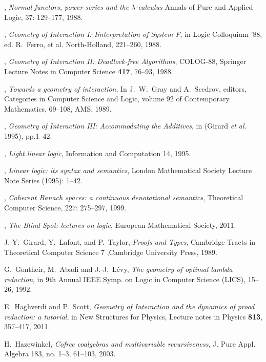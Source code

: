 \documentclass[english,letter paper,12pt,reqno]{article}
\theoremstyle{example}
\numberwithin{equation}{section}
\begin{document}
\begin{thebibliography}{BHLS03}
\bysame, \textsl{Normal functors, power series and the $\lambda$-calculus} Annals of Pure and Applied
Logic, 37: 129--177, 1988.

\bysame, \textsl{Geometry of {I}nteraction I: {I}interpretation of {S}ystem {F}}, in Logic Colloquium '88, ed. R.~Ferro, et al. North-Holland, 221--260, 1988.

\bysame, \textsl{Geometry of {I}nteraction II: {D}eadlock-free {A}lgorithms}, COLOG-88, Springer Lecture Notes in Computer Science \textbf{417}, 76--93, 1988.

\bysame, \textsl{Towards a geometry of interaction}, In J.~W.~Gray and A.~Scedrov, editors, Categories in Computer Science and Logic, volume 92 of Contemporary Mathematics, 69--108, AMS, 1989.

\bysame, \textsl{Geometry of {I}nteraction III: {A}ccommodating the {A}dditives}, in (Girard \textsl{et al}. 1995), pp.1--42.

\bysame, \textsl{Light linear logic}, Information and Computation 14, 1995.

\bysame, \textsl{Linear logic: its syntax and semantics}, London Mathematical Society Lecture Note Series (1995): 1--42.

\bysame, \textsl{Coherent {B}anach spaces: a continuous denotational semantics}, Theoretical Computer Science, 227: 275--297, 1999.

\bysame, \textsl{The Blind Spot: lectures on logic}, European Mathematical Society, 2011.

J.-Y.~Girard, Y.~Lafont, and P.~Taylor, \textsl{Proofs and Types}, Cambridge Tracts in Theoretical Computer Science 7 ,Cambridge University Press, 1989.

G.~Gontheir, M.~Abadi and J.-J.~L\'{e}vy, \textsl{The geometry of optimal lambda reduction}, in 9th Annual IEEE Symp. on Logic in Computer Science (LICS), 15--26, 1992.
  
E.~Haghverdi and P.~Scott, \textsl{Geometry of {I}nteraction and the dynamics of prood reduction: a tutorial}, in New Structures for Physics, Lecture notes in Physics \textbf{813}, 357--417, 2011.
  
H.~Hazewinkel, \textsl{Cofree coalgebras and multivariable recursiveness}, J. Pure Appl. Algebra 183, no. 1--3, 61--103, 2003.


\end{thebibliography}
\end{document}
